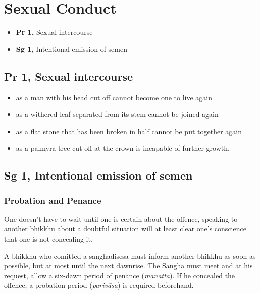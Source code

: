 \chapter{Sexual Conduct}

\begin{itemize}
\tightlist
\item
  \textbf{Pr 1,} Sexual intercourse
\item
  \textbf{Sg 1,} Intentional emission of semen
\end{itemize}

\section{Pr 1, Sexual intercourse}


\begin{itemize}
\tightlist
\item
  as a man with his head cut off cannot become one to live again
\item
  as a withered leaf separated from its stem cannot be joined again
\item
  as a flat stone that has been broken in half cannot be put together
  again
\item
  as a palmyra tree cut off at the crown is incapable of further growth.
\end{itemize}

\section{Sg 1, Intentional emission of semen}


\subsection{Probation and Penance}

One doesn't have to wait until one is certain about the offence,
speaking to another bhikkhu about a doubtful situation will at least
clear one's conscience that one is not concealing it.

A bhikkhu who comitted a sanghadisesa must inform another bhikkhu as
soon as possible, but at most until the next dawnrise. The Sangha must
meet and at his request, allow a six-dawn period of penance
(\emph{mānatta}). If he concealed the offence, a probation period
(\emph{parivāsa}) is required beforehand.

